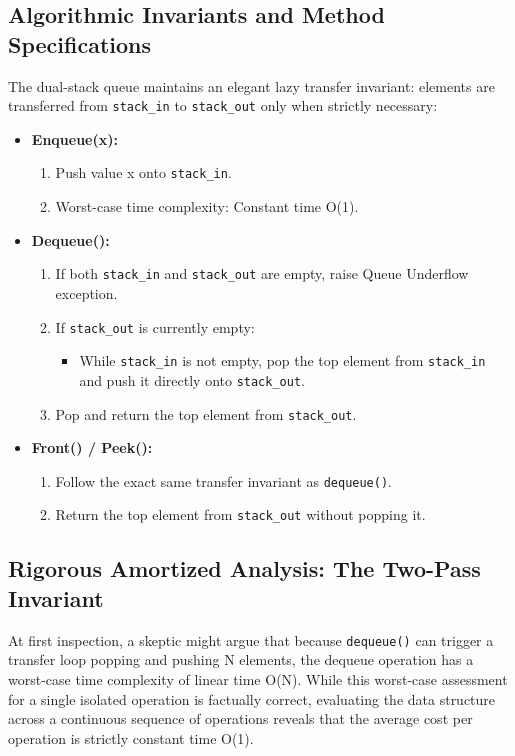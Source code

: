 \documentclass[10pt,journal,compsoc,onecolumn]{IEEEtran}
\begin{document}
\subsection{Algorithmic Invariants and Method Specifications}

The dual-stack queue maintains an elegant lazy transfer invariant: elements are transferred from \texttt{stack\_in} to \texttt{stack\_out} only when strictly necessary:
\begin{itemize}
    \item \textbf{Enqueue(x):}
    \begin{enumerate}
        \item Push value x onto \texttt{stack\_in}.
        \item Worst-case time complexity: Constant time O(1).
    \end{enumerate}
    \item \textbf{Dequeue():}
    \begin{enumerate}
        \item If both \texttt{stack\_in} and \texttt{stack\_out} are empty, raise Queue Underflow exception.
        \item If \texttt{stack\_out} is currently empty:
        \begin{itemize}
            \item While \texttt{stack\_in} is not empty, pop the top element from \texttt{stack\_in} and push it directly onto \texttt{stack\_out}.
        \end{itemize}
        \item Pop and return the top element from \texttt{stack\_out}.
    \end{enumerate}
    \item \textbf{Front() / Peek():}
    \begin{enumerate}
        \item Follow the exact same transfer invariant as \texttt{dequeue()}.
        \item Return the top element from \texttt{stack\_out} without popping it.
    \end{enumerate}
\end{itemize}

\subsection{Rigorous Amortized Analysis: The Two-Pass Invariant}

At first inspection, a skeptic might argue that because \texttt{dequeue()} can trigger a transfer loop popping and pushing N elements, the dequeue operation has a worst-case time complexity of linear time O(N). While this worst-case assessment for a single isolated operation is factually correct, evaluating the data structure across a continuous sequence of operations reveals that the average cost per operation is strictly constant time O(1).
\end{document}
